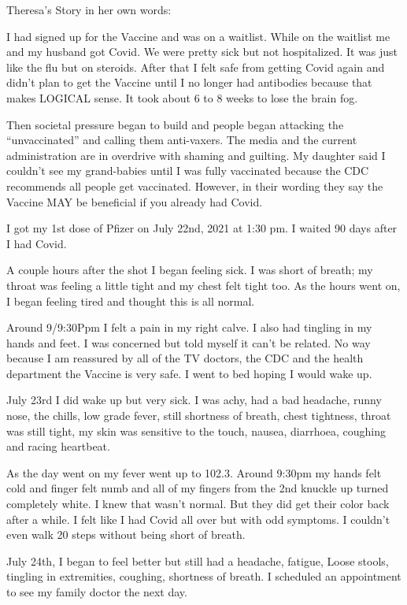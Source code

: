 Theresa’s Story in her own words:

I had signed up for the Vaccine and was on a waitlist. While on the waitlist me
and my husband got Covid. We were pretty sick but not hospitalized. It was just
like the flu but on steroids. After that I felt safe from getting Covid again
and didn’t plan to get the Vaccine until I no longer had antibodies because that
makes LOGICAL sense. It took about 6 to 8 weeks to lose the brain fog.

Then societal pressure began to build and people began attacking the
“unvaccinated” and calling them anti-vaxers. The media and the current
administration are in overdrive with shaming and guilting. My daughter said I
couldn’t see my grand-babies until I was fully vaccinated because the CDC
recommends all people get vaccinated. However, in their wording they say the
Vaccine MAY be beneficial if you already had Covid.

I got my 1st dose of Pfizer on July 22nd, 2021 at 1:30 pm. I waited 90 days
after I had Covid.

A couple hours after the shot I began feeling sick. I was short of breath; my
throat was feeling a little tight and my chest felt tight too. As the hours went
on, I began feeling tired and thought this is all normal.

Around 9/9:30Ppm I felt a pain in my right calve. I also had tingling in my
hands and feet. I was concerned but told myself it can’t be related. No way
because I am reassured by all of the TV doctors, the CDC and the health
department the Vaccine is very safe. I went to bed hoping I would wake up.

July 23rd I did wake up but very sick. I was achy, had a bad headache, runny
nose, the chills, low grade fever, still shortness of breath, chest tightness,
throat was still tight, my skin was sensitive to the touch, nausea, diarrhoea,
coughing and racing heartbeat.

As the day went on my fever went up to 102.3. Around 9:30pm my hands felt cold
and finger felt numb and all of my fingers from the 2nd knuckle up turned
completely white. I knew that wasn’t normal. But they did get their color back
after a while. I felt like I had Covid all over but with odd symptoms. I
couldn’t even walk 20 steps without being short of breath.

July 24th, I began to feel better but still had a headache, fatigue, Loose
stools, tingling in extremities, coughing, shortness of breath. I scheduled an
appointment to see my family doctor the next day.

